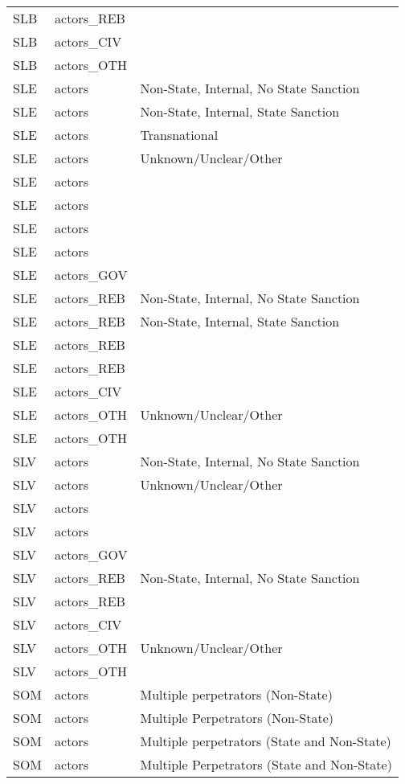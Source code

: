 \begin{table}[ht]
\begin{tabular}{lll}
  SLB & actors\_REB &  \\ 
  SLB & actors\_CIV &  \\ 
  SLB & actors\_OTH &  \\ 
  SLE & actors & Non-State, Internal, No State Sanction \\ 
  SLE & actors & Non-State, Internal, State Sanction \\ 
  SLE & actors & Transnational \\ 
  SLE & actors & Unknown/Unclear/Other \\ 
  SLE & actors &  \\ 
  SLE & actors &  \\ 
  SLE & actors &  \\ 
  SLE & actors &  \\ 
  SLE & actors\_GOV &  \\ 
  SLE & actors\_REB & Non-State, Internal, No State Sanction \\ 
  SLE & actors\_REB & Non-State, Internal, State Sanction \\ 
  SLE & actors\_REB &  \\ 
  SLE & actors\_REB &  \\ 
  SLE & actors\_CIV &  \\ 
  SLE & actors\_OTH & Unknown/Unclear/Other \\ 
  SLE & actors\_OTH &  \\ 
  SLV & actors & Non-State, Internal, No State Sanction \\ 
  SLV & actors & Unknown/Unclear/Other \\ 
  SLV & actors &  \\ 
  SLV & actors &  \\ 
  SLV & actors\_GOV &  \\ 
  SLV & actors\_REB & Non-State, Internal, No State Sanction \\ 
  SLV & actors\_REB &  \\ 
  SLV & actors\_CIV &  \\ 
  SLV & actors\_OTH & Unknown/Unclear/Other \\ 
  SLV & actors\_OTH &  \\ 
  SOM & actors & Multiple perpetrators (Non-State) \\ 
  SOM & actors & Multiple Perpetrators (Non-State) \\ 
  SOM & actors & Multiple perpetrators (State and Non-State) \\ 
  SOM & actors & Multiple Perpetrators (State and Non-State) \\ 

\end{tabular}
\end{table}
